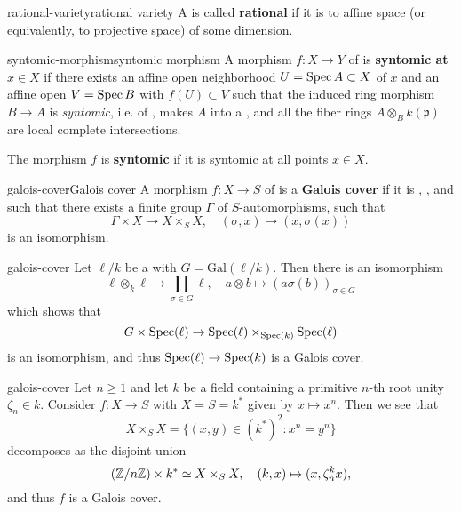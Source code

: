 \begin{topic}{rational-variety}{rational variety}
    A  is called \textbf{rational} if it is  to affine space (or equivalently, to projective space) of some dimension.
\end{topic}

\begin{topic}{syntomic-morphism}{syntomic morphism}
    A morphism $f : X \to Y$ of  is \textbf{syntomic at $x \in X$} if there exists an affine open neighborhood $U = \operatorname{Spec} A \subset X$ of $x$ and an affine open $V = \operatorname{Spec} B$ with $f(U) \subset V$ such that the induced ring morphism $B \to A$ is \textit{syntomic}, i.e. of , makes $A$ into a  , and all the fiber rings $A \otimes_B k(\mathfrak{p})$ are local complete intersections.
    
    The morphism $f$ is \textbf{syntomic} if it is syntomic at all points $x \in X$.
\end{topic}

\begin{topic}{galois-cover}{Galois cover}
    A morphism $f : X \to S$ of  is a \textbf{Galois cover} if it is , , and such that there exists a finite group $\Gamma$ of $S$-automorphisms, such that
    \[ \Gamma \times X \to X \times_S X, \quad (\sigma, x) \mapsto (x, \sigma(x)) \]
    is an isomorphism.
\end{topic}

\begin{example}{galois-cover}
    Let $\ell / k$ be a  with  $G = \text{Gal}(\ell/k)$. Then there is an isomorphism
    \[ \ell \otimes_k \ell \to \prod_{\sigma \in G} \ell, \quad a \otimes b \mapsto (a \sigma(b))_{\sigma \in G} \]
    which shows that
    \[ G \times \operatorname{Spec}(\ell) \to \operatorname{Spec}(\ell) \times_{\operatorname{Spec}(k)} \operatorname{Spec}(\ell) \]
    is an isomorphism, and thus $\operatorname{Spec}(\ell) \to \operatorname{Spec}(k)$ is a Galois cover.
\end{example}

\begin{example}{galois-cover}
    Let $n \ge 1$ and let $k$ be a field containing a primitive $n$-th root unity $\zeta_n \in k$. Consider $f : X \to S$ with $X = S = k^*$ given by $x \mapsto x^n$. Then we see that
    \[ X \times_S X = \{ (x, y) \in (k^*)^2 : x^n = y^n \} \]
    decomposes as the disjoint union
    \[ (\mathbb{Z}/n\mathbb{Z}) \times k^* \simeq X \times_S X, \quad (k, x) \mapsto (x, \zeta_n^k x) , \]
    and thus $f$ is a Galois cover.
\end{example}

